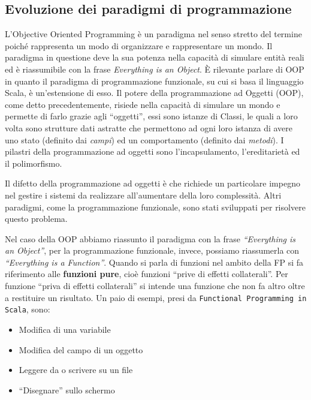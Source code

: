 \documentclass[12pt,a4paper,openright,twoside]{book}
\begin{document}
\subsection{Evoluzione dei paradigmi di programmazione}

L'Objective Oriented Programming è un paradigma nel senso stretto del termine poiché rappresenta un modo di organizzare e rappresentare un mondo. 
Il paradigma in questione deve la sua potenza nella capacità di simulare entità reali ed è riassumibile con la frase \textit{Everything is an Object}. 
È rilevante parlare di OOP in quanto il paradigma di programmazione funzionale, su cui si basa il linguaggio Scala, è un'estensione di esso. 
Il potere della programmazione ad Oggetti (OOP), come detto precedentemente, risiede nella capacità di simulare un mondo e permette di farlo grazie agli ``oggetti'', essi sono istanze di Classi, le quali a loro volta sono strutture dati astratte che permettono ad ogni loro istanza di avere uno stato (definito dai \textit{campi}) ed un comportamento (definito dai \textit{metodi}).
I pilastri della programmazione ad oggetti sono l'incapsulamento, l'ereditarietà ed il polimorfismo.

Il difetto della programmazione ad oggetti è che richiede un particolare impegno nel gestire i sistemi da realizzare all'aumentare della loro complessità. Altri paradigmi, come la programmazione funzionale, sono stati sviluppati per risolvere questo problema.

Nel caso della OOP abbiamo riassunto il paradigma con la frase \textit{``Everything is an Object''}, per la programmazione funzionale, invece, possiamo riassumerla con \textit{``Everything is a Function''}. Quando si parla di funzioni nel ambito della \ac{FP} si fa riferimento alle \textbf{funzioni pure}\cite{Hunt2018}, cioè funzioni ``prive di effetti collaterali''. Per funzione ``priva di effetti collaterali'' si intende una funzione che non fa altro oltre a restituire un risultato. Un paio di esempi, presi da \texttt{Functional Programming in Scala}, sono:

\begin{itemize}
    \item Modifica di una variabile
    \item Modifica del campo di un oggetto
    \item Leggere da o scrivere su un file
    \item ``Disegnare'' sullo schermo
\end{itemize}
\end{document}
